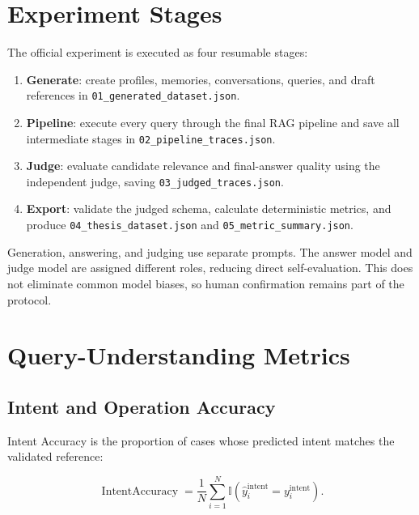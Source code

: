 \section{Experiment Stages}

The official experiment is executed as four resumable stages:

\begin{enumerate}
    \item \textbf{Generate}: create profiles, memories, conversations, queries,
    and draft references in \texttt{01\_generated\_dataset.json}.

    \item \textbf{Pipeline}: execute every query through the final RAG pipeline
    and save all intermediate stages in
    \texttt{02\_pipeline\_traces.json}.

    \item \textbf{Judge}: evaluate candidate relevance and final-answer quality
    using the independent judge, saving
    \texttt{03\_judged\_traces.json}.

    \item \textbf{Export}: validate the judged schema, calculate deterministic
    metrics, and produce \texttt{04\_thesis\_dataset.json} and
    \texttt{05\_metric\_summary.json}.
\end{enumerate}

Generation, answering, and judging use separate prompts. The answer model and
judge model are assigned different roles, reducing direct self-evaluation.
This does not eliminate common model biases, so human confirmation remains part
of the protocol.

\section{Query-Understanding Metrics}

\subsection{Intent and Operation Accuracy}

Intent Accuracy is the proportion of cases whose predicted intent matches the
validated reference:

\begin{equation}
\operatorname{IntentAccuracy}
=\frac{1}{N}\sum_{i=1}^{N}
\mathbb{I}(\hat{y}^{\mathrm{intent}}_i=y^{\mathrm{intent}}_i).
\end{equation}

